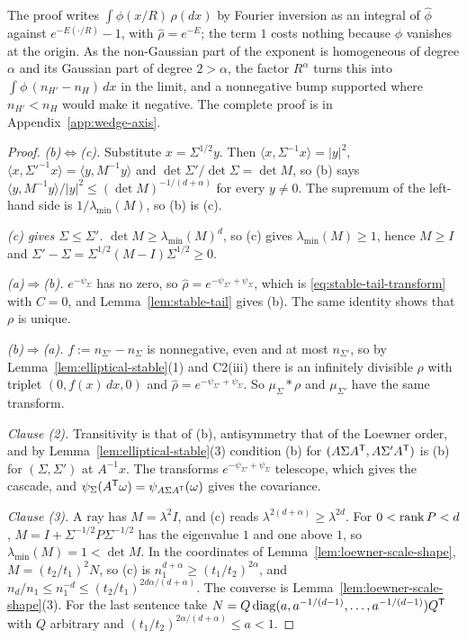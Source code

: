 The proof writes $\int\phi(x/R)\,\rho(dx)$ by Fourier inversion as an integral of $\widehat\phi$ against
$e^{-E(\cdot/R)} - 1$, with $\widehat\rho = e^{-E}$; the term $1$ costs nothing because $\phi$ vanishes
at the origin. As the non-Gaussian part of the exponent is homogeneous of degree $\alpha$ and its Gaussian part of
degree $2 > \alpha$, the factor $R^\alpha$ turns this into $\int\phi\,(n_{H'} - n_H)\,dx$ in the limit, and a nonnegative bump supported where
$n_{H'} < n_H$ would make it negative. The complete proof is in Appendix~\ref{app:wedge-axis}.

\begin{proof}
\emph{(b)$\Leftrightarrow$(c).} Substitute $x = \Sigma^{1/2}y$. Then
$\langle x,\Sigma^{-1}x\rangle = |y|^2$, $\langle x,\Sigma'^{-1}x\rangle = \langle y,M^{-1}y\rangle$ and
$\det\Sigma'/\det\Sigma = \det M$, so (b) says $\langle y,M^{-1}y\rangle/|y|^2 \le
(\det M)^{-1/(d+\alpha)}$ for every $y \ne 0$. The supremum of the left-hand side is $1/\lambda_{\min}(M)$,
so (b) is (c).

\emph{(c) gives $\Sigma \le \Sigma'$.} $\det M \ge \lambda_{\min}(M)^d$, so (c) gives $\lambda_{\min}(M) \ge 1$,
hence $M \ge I$ and $\Sigma' - \Sigma = \Sigma^{1/2}(M - I)\Sigma^{1/2} \ge 0$.

\emph{(a)$\Rightarrow$(b).} $e^{-\psi_\Sigma}$ has no zero, so
$\widehat\rho = e^{-\psi_{\Sigma'} + \psi_\Sigma}$, which is \ref{eq:stable-tail-transform} with $C = 0$,
and Lemma~\ref{lem:stable-tail} gives (b). The same identity shows that $\rho$ is unique.

\emph{(b)$\Rightarrow$(a).} $f := n_{\Sigma'} - n_\Sigma$ is nonnegative, even and at most $n_{\Sigma'}$,
so by Lemma~\ref{lem:elliptical-stable}(1) and C2(iii) there is an infinitely divisible $\rho$ with
triplet $(0, f(x)\,dx, 0)$ and $\widehat\rho = e^{-\psi_{\Sigma'} + \psi_\Sigma}$. So
$\mu_\Sigma * \rho$ and $\mu_{\Sigma'}$ have the same transform.

\emph{Clause (2).} Transitivity is that of (b), antisymmetry that of the Loewner order, and by
Lemma~\ref{lem:elliptical-stable}(3) condition (b) for $(A\Sigma A^{\mathsf{T}}, A\Sigma'A^{\mathsf{T}})$ is (b) for
$(\Sigma, \Sigma')$ at $A^{-1}x$. The transforms $e^{-\psi_{\Sigma'} + \psi_\Sigma}$ telescope, which
gives the cascade, and $\psi_\Sigma(A^{\mathsf{T}}\omega) = \psi_{A\Sigma A^{\mathsf{T}}}(\omega)$ gives the
covariance.

\emph{Clause (3).} A ray has $M = \lambda^2I$, and (c) reads $\lambda^{2(d+\alpha)} \ge \lambda^{2d}$. For
$0 < \operatorname{rank} P < d$, $M = I + \Sigma^{-1/2}P\Sigma^{-1/2}$ has the eigenvalue $1$ and one above $1$, so
$\lambda_{\min}(M) = 1 < \det M$. In the coordinates of Lemma~\ref{lem:loewner-scale-shape},
$M = (t_2/t_1)^2N$, so (c) is $n_1^{d+\alpha} \ge (t_1/t_2)^{2\alpha}$, and
$n_d/n_1 \le n_1^{-d} \le (t_2/t_1)^{2d\alpha/(d+\alpha)}$. The converse is
Lemma~\ref{lem:loewner-scale-shape}(3). For the last sentence take
$N = Q\operatorname{diag}(a, a^{-1/(d-1)}, \dots, a^{-1/(d-1)})Q^{\mathsf{T}}$ with $Q$ arbitrary and
$(t_1/t_2)^{2\alpha/(d+\alpha)} \le a < 1$.
\end{proof}

